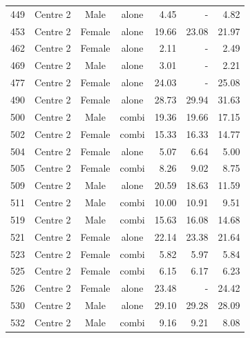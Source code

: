 \begin{table}[p]
\begin{tabular}{|cccc|rrr|}
449&Centre 2&Male&alone&4.45&-&4.82\\
453&Centre 2&Female&alone&19.66&23.08&21.97\\
462&Centre 2&Female&alone&2.11&-&2.49\\
469&Centre 2&Male&alone&3.01&-&2.21\\
477&Centre 2&Female&alone&24.03&-&25.08\\
490&Centre 2&Female&alone&28.73&29.94&31.63\\
500&Centre 2&Male&combi&19.36&19.66&17.15\\
502&Centre 2&Female&combi&15.33&16.33&14.77\\
504&Centre 2&Female&alone&5.07&6.64&5.00\\
505&Centre 2&Female&combi&8.26&9.02&8.75\\
509&Centre 2&Male&alone&20.59&18.63&11.59\\
511&Centre 2&Male&combi&10.00&10.91&9.51\\
519&Centre 2&Male&combi&15.63&16.08&14.68\\
521&Centre 2&Female&alone&22.14&23.38&21.64\\
523&Centre 2&Female&combi&5.82&5.97&5.84\\
525&Centre 2&Female&combi&6.15&6.17&6.23\\
526&Centre 2&Female&alone&23.48&-&24.42\\
530&Centre 2&Male&alone&29.10&29.28&28.09\\
532&Centre 2&Male&combi&9.16&9.21&8.08\\
\hline
\end{tabular}
\end{table}
\pagebreak
